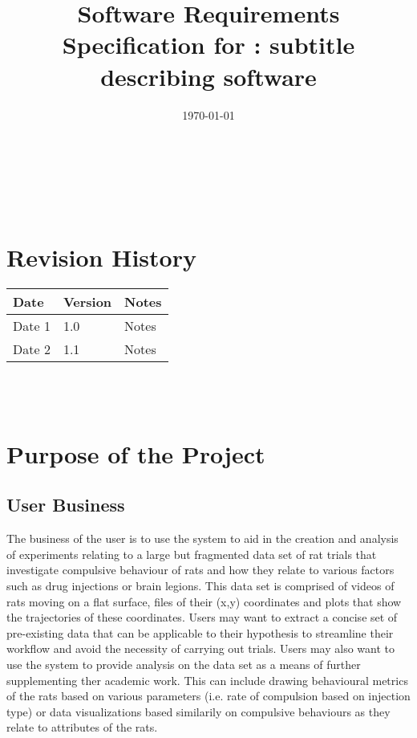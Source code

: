 \documentclass[12pt]{article}
\begin{document}
\title{Software Requirements Specification for \progname: subtitle describing software} 
\author{\authname}
\date{\today}
	
\maketitle

~\newpage


\tableofcontents

~\newpage

\section*{Revision History}

\begin{tabularx}{\textwidth}{p{3cm}p{2cm}X}
\toprule {\textbf{Date}} & {\textbf{Version}} & {\textbf{Notes}}\\
\midrule
Date 1 & 1.0 & Notes\\
Date 2 & 1.1 & Notes\\
\bottomrule
\end{tabularx}

~\\

~\newpage
\section{Purpose of the Project}
\subsection{User Business}

\par{The business of the user is to use the system to aid in the
creation and analysis of experiments relating to a large but fragmented data set
of rat trials that investigate compulsive behaviour of rats and how they relate to various 
factors such as drug injections or brain legions. This data set is comprised of videos of rats
moving on a flat surface, files of their (x,y) coordinates and plots that show the trajectories
of these coordinates. Users may want to
extract a concise set of pre-existing data that can be applicable to
their hypothesis to streamline their workflow and avoid the necessity of carrying out trials.
Users may also want to use the system to provide analysis on the data set as a means of
further supplementing ther academic work. This can include drawing behavioural metrics of the rats
based on various parameters (i.e. rate of compulsion based on injection type) or data visualizations
based similarily on compulsive behaviours as they relate to attributes of the rats.}
\end{document}
